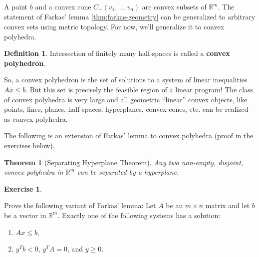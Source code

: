 \documentclass[
]{book}
\providecommand{\tightlist}{%
  \setlength{\itemsep}{0pt}\setlength{\parskip}{0pt}}
\newtheorem{theorem}{Theorem}[chapter]
\theoremstyle{definition}
\newtheorem{definition}{Definition}[chapter]
\theoremstyle{definition}
\theoremstyle{definition}
\newtheorem{exercise}{Exercise}[chapter]
\theoremstyle{definition}
\theoremstyle{remark}
\begin{document}
A point \(b\) and a convex cone \(C_+(v_1, \dots, v_n)\) are convex subsets of \(\mathbb{R}^m\).
The statement of Farkas' lemma \ref{thm:farkas-geometry} can be generalized to arbitrary convex sets using metric topology.
For now, we'll generalize it to convex polyhedra.

\begin{definition}
Intersection of finitely many half-spaces is called a \textbf{convex polyhedron}.
\end{definition}

So, a convex polyhedron is the set of solutions to a system of linear inequalities \(A x \le b\).
But this set is precisely the feasible region of a linear program!
The class of convex polyhedra is very large and all geometric ``linear'' convex objects, like points, lines, planes, half-spaces, hyperplanes, convex cones, etc. can be realized as convex polyhedra.

The following is an extension of Farkas' lemma to convex polyhedra (proof in the exercises below).

\begin{theorem}[Separating Hyperplane Theorem]
\protect\hypertarget{thm:separating-hyperplane}{}\label{thm:separating-hyperplane}Any two non-empty, disjoint, convex polyhedra in \(\mathbb{R}^m\) can be separated by a hyperplane.
\end{theorem}

\begin{exercise}
\protect\hypertarget{exr:farkas-variant}{}\label{exr:farkas-variant}

Prove the following variant of Farkas' lemma: Let \(A\) be an \(m \times n\) matrix and let \(b\) be a vector in \(\mathbb{R}^m\).
Exactly one of the following systems has a solution:

\begin{enumerate}
\def\labelenumi{\arabic{enumi}.}
\tightlist
\item
  \(Ax \le b\),
\item
  \(y^T b < 0\), \(y^T A = 0\), and \(y \ge 0\).
\end{enumerate}

\end{exercise}
\end{document}
